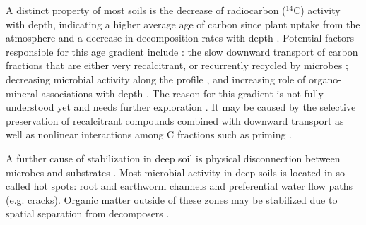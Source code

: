 \documentclass[11pt, oneside, a4paper]{article}   	%
\begin{document}
A distinct property of most soils is the decrease of radiocarbon ($^{14}$C) activity with
depth, indicating a higher average age of carbon since plant uptake from the atmosphere and a decrease in decomposition rates with depth \citep{Mathieu2015, He2016, Lawrence2020, Rumpel2011, Heckman2022, Scheibe2023, HicksPries2023}. Potential factors responsible for this age gradient include
 \citep[c.f.][]{Ahrens2020}:  the slow
downward transport of carbon fractions that are either very recalcitrant, or recurrently recycled by microbes \citep{Elzein1995, Gleixner2013, Kaiser2012, Roth2019};
decreasing microbial activity along
the profile \citep{Jenkinson2008, Persson2000, Koven2013BGS, Wang2021}, and increasing role of organo-mineral associations with depth \citep{Rumpel2011, Eusterhues2003, Rasmussen2018, Cotrufo2022, Georgiou2022, HicksPries2023}. The reason for this gradient is not fully understood
yet and needs further exploration \citep{Guo2023}. It may be caused by the selective preservation of recalcitrant compounds combined with downward transport \citep{Elzein1995, Luo2020} as well as nonlinear interactions among C fractions such as priming \citep{Guenet2013, Liang2018, Wang2021}. 

A further cause of stabilization in deep soil is physical disconnection between microbes and substrates \citep{Don2013, Gleixner2013}. Most microbial activity in deep soils is located in
so-called hot spots: root and earthworm channels and preferential water flow paths
(e.g. cracks). Organic matter outside of these zones may be stabilized due to spatial
separation from decomposers \citep{Chabbi2009}. 
\end{document}
